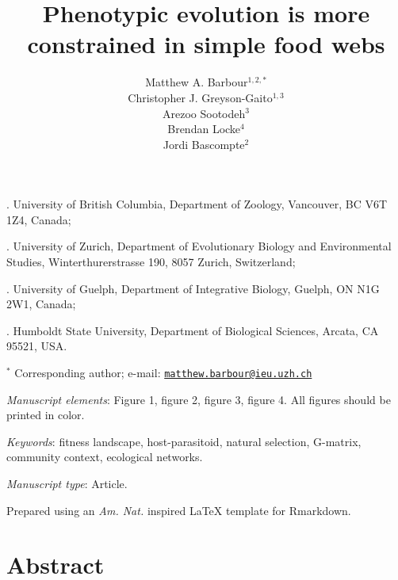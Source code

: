 \documentclass[11pt,]{article}
\title{Phenotypic evolution is more constrained in simple food webs}
\author{Matthew A. Barbour\(^{1,2,\ast}\) \\ Christopher J. Greyson-Gaito\(^{1,3}\) \\ Arezoo Sootodeh\(^{3}\) \\ Brendan Locke\(^{4}\) \\ Jordi Bascompte\(^{2}\)}
\date{}
\begin{document}
\maketitle


. University of British Columbia, Department of Zoology,
Vancouver, BC V6T 1Z4, Canada;

. University of Zurich, Department of Evolutionary Biology
and Environmental Studies, Winterthurerstrasse 190, 8057 Zurich,
Switzerland;

. University of Guelph, Department of Integrative Biology,
Guelph, ON N1G 2W1, Canada;

. Humboldt State University, Department of Biological
Sciences, Arcata, CA 95521, USA.

\(^\ast\) Corresponding author; e-mail:
\href{mailto:matthew.barbour@ieu.uzh.ch}{\nolinkurl{matthew.barbour@ieu.uzh.ch}}

\bigskip

\emph{Manuscript elements}: Figure 1, figure 2, figure 3, figure 4. All
figures should be printed in color.

\bigskip

\emph{Keywords}: fitness landscape, host-parasitoid, natural selection,
G-matrix, community context, ecological networks.

\bigskip

\emph{Manuscript type}: Article.

\bigskip

\footnotesize Prepared using an \emph{Am. Nat.} inspired \LaTeX{}
template for Rmarkdown. \normalsize

\linenumbers{} \modulolinenumbers[3]

\newpage

\section{Abstract}\label{abstract}
\end{document}
